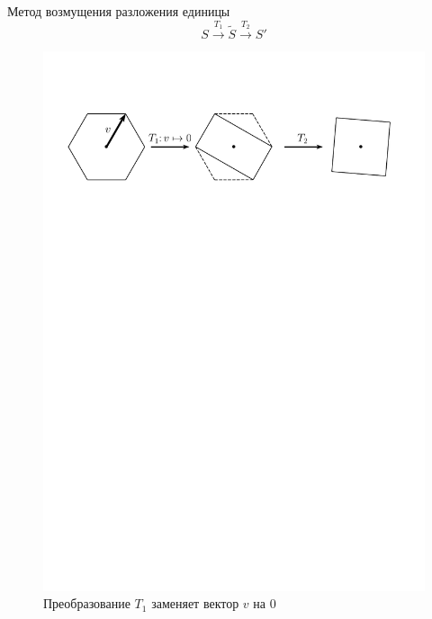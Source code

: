 \documentclass{beamer}
\begin{document}
\begin{frame}{Метод возмущения разложения единицы}
	\begin{equation*}
		S\xrightarrow{T_1}\tilde{S}\xrightarrow{T_2}S'
	\end{equation*}\pause
	\begin{figure}[h!]
		\begin{center}
			\includegraphics[scale=0.55]{pics/pertubation.pdf}
			\caption{Преобразование $T_1$ заменяет вектор $v$ на 0}
		\end{center}
	\end{figure}
\end{frame}
\end{document}
